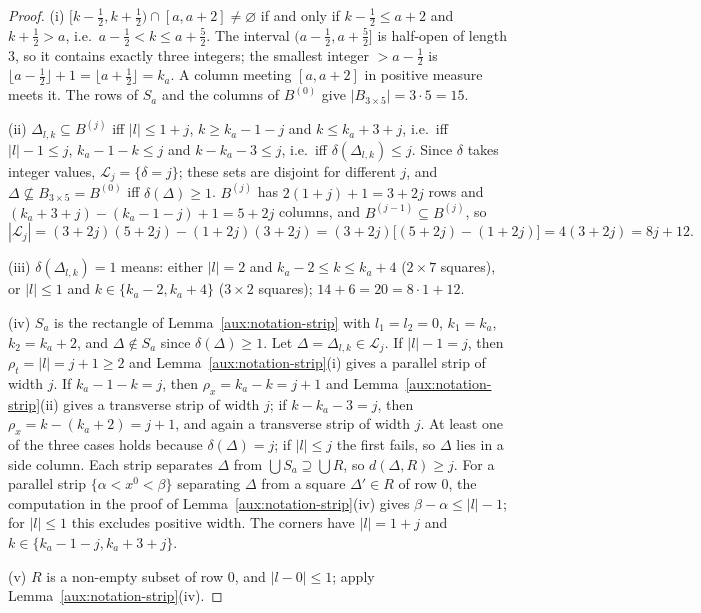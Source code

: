 \documentclass[11pt,a4paper]{article}
\theoremstyle{plain}
\theoremstyle{definition}
\theoremstyle{plain}
\theoremstyle{definition}
\begin{document}
\begin{proof}
(i) $[k-\frac12,k+\frac12)\cap[a,a+2]\ne\varnothing$ if and only if $k-\frac12\le a+2$ and
$k+\frac12>a$, i.e.\ $a-\frac12<k\le a+\frac52$.  The interval $(a-\frac12,a+\frac52]$ is
half-open of length $3$, so it contains exactly three integers; the smallest integer
$>a-\frac12$ is $\lfloor a-\frac12\rfloor+1=\lfloor a+\frac12\rfloor=k_a$.  A column meeting
$[a,a+2]$ in positive measure meets it.  The rows of $S_a$ and the columns of $B^{(0)}$ give
$|B_{3\times5}|=3\cdot5=15$.

(ii) $\Delta_{l,k}\subseteq B^{(j)}$ iff $|l|\le1+j$, $k\ge k_a-1-j$ and $k\le k_a+3+j$, i.e.\
iff $|l|-1\le j$, $k_a-1-k\le j$ and $k-k_a-3\le j$, i.e.\ iff $\delta(\Delta_{l,k})\le j$.
Since $\delta$ takes integer values, $\mathcal L_j=\{\delta=j\}$; these sets are disjoint
for different $j$, and $\Delta\not\subseteq B_{3\times5}=B^{(0)}$ iff $\delta(\Delta)\ge1$.
$B^{(j)}$ has $2(1+j)+1=3+2j$ rows and $(k_a+3+j)-(k_a-1-j)+1=5+2j$ columns, and
$B^{(j-1)}\subseteq B^{(j)}$, so
\[
 |\mathcal L_j|=(3+2j)(5+2j)-(1+2j)(3+2j)=(3+2j)\bigl[(5+2j)-(1+2j)\bigr]=4(3+2j)=8j+12 .
\]

(iii) $\delta(\Delta_{l,k})=1$ means: either $|l|=2$ and $k_a-2\le k\le k_a+4$ ($2\times7$
squares), or $|l|\le1$ and $k\in\{k_a-2,k_a+4\}$ ($3\times2$ squares); $14+6=20=8\cdot1+12$.

(iv) $S_a$ is the rectangle of Lemma~\ref{aux:notation-strip} with $l_1=l_2=0$, $k_1=k_a$,
$k_2=k_a+2$, and $\Delta\notin S_a$ since $\delta(\Delta)\ge1$.  Let $\Delta=\Delta_{l,k}\in
\mathcal L_j$.  If $|l|-1=j$, then $\rho_t=|l|=j+1\ge2$ and Lemma~\ref{aux:notation-strip}(i)
gives a parallel strip of width $j$.  If $k_a-1-k=j$, then $\rho_x=k_a-k=j+1$ and
Lemma~\ref{aux:notation-strip}(ii) gives a transverse strip of width $j$; if $k-k_a-3=j$, then
$\rho_x=k-(k_a+2)=j+1$, and again a transverse strip of width $j$.  At least one of the three
cases holds because $\delta(\Delta)=j$; if $|l|\le j$ the first fails, so $\Delta$ lies in a
side column.  Each strip separates $\Delta$ from $\bigcup S_a\supseteq\bigcup R$, so
$d(\Delta,R)\ge j$.  For a parallel strip $\{\alpha<x^0<\beta\}$ separating $\Delta$ from a
square $\Delta'\in R$ of row $0$, the computation in the proof of
Lemma~\ref{aux:notation-strip}(iv) gives $\beta-\alpha\le|l|-1$; for $|l|\le1$ this excludes
positive width.  The corners have $|l|=1+j$ and $k\in\{k_a-1-j,k_a+3+j\}$.

(v) $R$ is a non-empty subset of row $0$, and $|l-0|\le1$; apply
Lemma~\ref{aux:notation-strip}(iv).


\end{proof}
\end{document}
